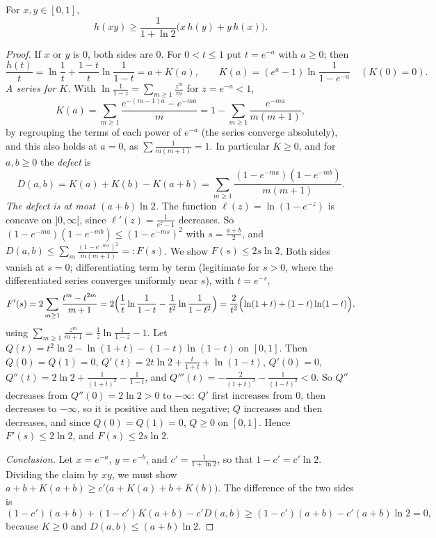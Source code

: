 \begin{lemma}\label{conjectures:lem:hxy}
For $x,y\in[0,1]$,
\[
h(xy)\ge\frac1{1+\ln2}\bigl(x\,h(y)+y\,h(x)\bigr).
\]
\end{lemma}
\begin{proof}
If $x$ or $y$ is $0$, both sides are $0$. For $0<t\le1$ put $t=e^{-a}$ with $a\ge0$; then
\[
\frac{h(t)}t=\ln\frac1t+\frac{1-t}t\ln\frac1{1-t}=a+K(a),\qquad K(a)=(e^a-1)\ln\frac1{1-e^{-a}}\quad(K(0)=0).
\]
\emph{A series for $K$.} With $\ln\frac1{1-z}=\sum_{m\ge1}\frac{z^m}m$ for $z=e^{-a}<1$,
\[
K(a)=\sum_{m\ge1}\frac{e^{-(m-1)a}-e^{-ma}}m=1-\sum_{m\ge1}\frac{e^{-ma}}{m(m+1)},
\]
by regrouping the terms of each power of $e^{-a}$ (the series converge absolutely), and this also holds at $a=0$, as $\sum\frac1{m(m+1)}=1$. In
particular $K\ge0$, and for $a,b\ge0$ the \emph{defect} is
\[
D(a,b)=K(a)+K(b)-K(a+b)=\sum_{m\ge1}\frac{(1-e^{-ma})(1-e^{-mb})}{m(m+1)}.
\]
\emph{The defect is at most $(a+b)\ln2$.} The function $\ell(z)=\ln(1-e^{-z})$ is concave on $]0,\infty[$, since $\ell'(z)=\frac1{e^z-1}$ decreases. So
$(1-e^{-ma})(1-e^{-mb})\le(1-e^{-ms})^2$ with $s=\frac{a+b}2$, and $D(a,b)\le\sum_m\frac{(1-e^{-ms})^2}{m(m+1)}=:F(s)$. We show $F(s)\le2s\ln2$. Both sides
vanish at $s=0$; differentiating term by term (legitimate for $s>0$, where the differentiated series converges uniformly near $s$), with $t=e^{-s}$,
\[
F'(s)=2\sum_{m\ge1}\frac{t^m-t^{2m}}{m+1}=2\Bigl(\frac1t\ln\frac1{1-t}-\frac1{t^2}\ln\frac1{1-t^2}\Bigr)=\frac2{t^2}\Bigl(\ln(1+t)+(1-t)\ln(1-t)\Bigr),
\]
using $\sum_{m\ge1}\frac{z^m}{m+1}=\frac1z\ln\frac1{1-z}-1$. Let $Q(t)=t^2\ln2-\ln(1+t)-(1-t)\ln(1-t)$ on $[0,1]$. Then $Q(0)=Q(1)=0$,
$Q'(t)=2t\ln2+\frac t{1+t}+\ln(1-t)$, $Q'(0)=0$, $Q''(t)=2\ln2+\frac1{(1+t)^2}-\frac1{1-t}$, and $Q'''(t)=-\frac2{(1+t)^3}-\frac1{(1-t)^2}<0$. So $Q''$
decreases from $Q''(0)=2\ln2>0$ to $-\infty$: $Q'$ first increases from $0$, then decreases to $-\infty$, so it is positive and then negative; $Q$
increases and then decreases, and since $Q(0)=Q(1)=0$, $Q\ge0$ on $[0,1]$. Hence $F'(s)\le2\ln2$, and $F(s)\le2s\ln2$.

\emph{Conclusion.} Let $x=e^{-a}$, $y=e^{-b}$, and $c'=\frac1{1+\ln2}$, so that $1-c'=c'\ln2$. Dividing the claim by $xy$, we must show
$a+b+K(a+b)\ge c'\bigl(a+K(a)+b+K(b)\bigr)$. The difference of the two sides is
\[
(1-c')(a+b)+(1-c')K(a+b)-c'D(a,b)\ge(1-c')(a+b)-c'(a+b)\ln2=0,
\]
because $K\ge0$ and $D(a,b)\le(a+b)\ln2$.
\end{proof}

